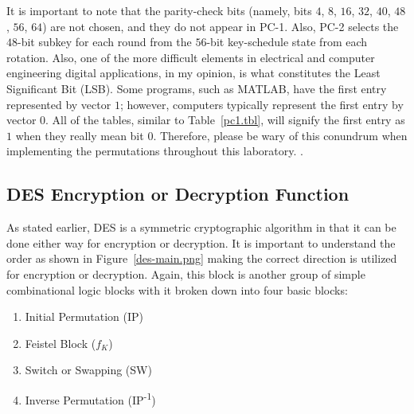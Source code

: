 \documentclass{article}
\begin{document}
It is important to note that the parity-check bits (namely, bits $4$, $8$,
$16$, $32$, $40$, $48$, $56$, $64$) are not chosen, and they do not
appear in PC-1.  Also, PC-2 selects the $48$-bit subkey for each round
from the $56$-bit key-schedule state from each rotation.  Also, one of
the more difficult elements in electrical and computer engineering
digital applications, in my opinion,
is what constitutes the Least Significant Bit (LSB).  Some programs,
such as MATLAB, have the first entry represented by vector $1$;
however, computers typically represent the first entry by vector $0$.
All of the tables, similar to Table~\ref{pc1.tbl}, will signify the
first entry as $1$ when they really mean bit $0$.  Therefore, please
be wary of this conundrum when implementing the permutations
throughout this laboratory.
.  
  
\subsection{DES Encryption or Decryption Function}

As stated earlier, DES is a symmetric cryptographic algorithm in
that it can be done either way for encryption or decryption.  It is
important to understand the order as shown in
Figure~\ref{des-main.png} making the correct direction is utilized
for encryption or decryption.  Again, this block is another group of simple
combinational logic blocks with it broken down into four basic
blocks:
\begin{enumerate}
\item Initial Permutation (IP)
\item Feistel Block ($f_K$)
\item Switch or Swapping (SW)
\item Inverse Permutation (IP\textsuperscript{-1})
\end{enumerate}
\end{document}
